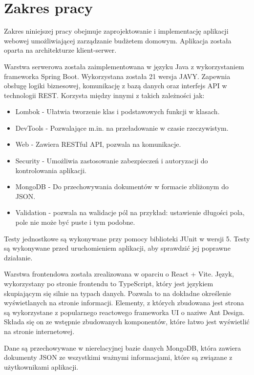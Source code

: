 \section{Zakres pracy}
Zakres niniejszej pracy obejmuje zaprojektowanie i implementację aplikacji webowej umożliwiającej zarządzanie budżetem domowym. 
Aplikacja została oparta na architekturze klient-serwer. 

Warstwa serwerowa została zaimplementowana w języku Java z wykorzystaniem frameworka Spring Boot. Wykorzystana została 21 wersja JAVY. Zapewnia obsługę logiki biznesowej, komunikację z bazą danych oraz interfejs API w technologii REST.  Korzysta między innymi z takich zależności jak: 
\begin{itemize}
	\item Lombok - Ułatwia tworzenie klas i podstawowych funkcji w klasach.
	\item DevTools - Pozwalające m.in. na przeładowanie w czasie rzeczywistym.
	\item Web - Zawiera RESTful API, pozwala na komunikacje.
	\item Security - Umożliwia zastosowanie zabezpieczeń i autoryzacji do kontrolowania aplikacji.
	\item MongoDB - Do przechowywania dokumentów w formacie zbliżonym do JSON.
	\item Validation - pozwala na walidacje pól na przykład: ustawienie długości pola, pole nie może być puste i tym podobne.
\end{itemize}
Testy jednostkowe są wykonywane przy pomocy biblioteki JUnit w wersji 5. Testy są wykonywane przed uruchomieniem aplikacji, aby sprawdzić jej poprawne działanie. 

Warstwa frontendowa została zrealizowana w oparciu o React + Vite. Język, wykorzystany po stronie frontendu to TypeScript, który jest językiem skupiającym się silnie na typach danych. Pozwala to na dokładne określenie wyświetlanych na stronie informacji. Elementy, z których zbudowana jest strona są wykorzystane z popularnego reactowego frameworka UI o naziwe Ant Design. Składa się on ze wstępnie zbudowanych komponentów, które łatwo jest wyświetlić na stronie internetowej.

Dane są przechowywane w nierelacyjnej bazie danych MongoDB, która zawiera dokumenty JSON ze wszystkimi ważnymi informacjami, które są związane z użytkownikami aplikacji.


